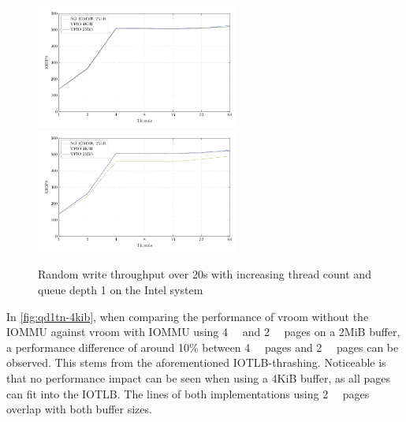 \begin{figure}[H]
  \centering
   {\includegraphics[width=0.6\textwidth]{figures/qd1tn_1page}}
   {\includegraphics[width=0.6\textwidth]{figures/qd1tn_512page}}
  \caption{Random write throughput over 20s with increasing thread count and queue depth 1 on the Intel system}
  \label{fig:qd1tn-4kib}
\end{figure}

In \autoref{fig:qd1tn-4kib}, when comparing the performance of vroom without the IOMMU against vroom with IOMMU using \qty{4}{\kibi\byte} and \qty{2}{\mebi\byte} pages on a 2MiB buffer, a performance difference of around 10\% between \qty{4}{\kibi\byte} pages and \qty{2}{\mebi\byte} pages can be observed. This stems from the aforementioned IOTLB-thrashing. Noticeable is that no performance impact can be seen when using a 4KiB buffer, as all pages can fit into the IOTLB. The lines of both implementations using \qty{2}{\mebi\byte} pages overlap with both buffer sizes.

